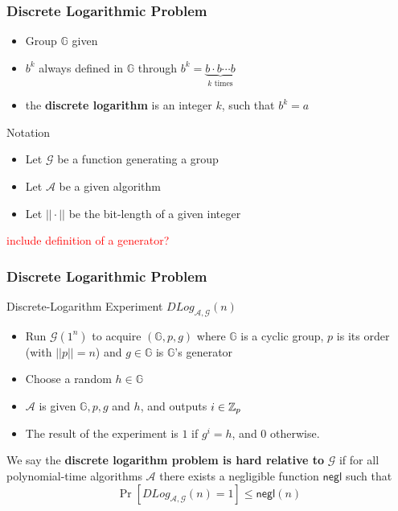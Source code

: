 \begin{frame}
	\frametitle{Discrete Logarithmic Problem}

	\begin{definition}
		\begin{itemize}
			\item Group $\mathbb{G}$ given
			\item $b^k$ always defined in $\mathbb{G}$ through $b^k = \underbrace{b\cdot b \cdots b}_{k\text{ times}}$
			\item the \textbf{discrete logarithm} is an integer $k$, such that $b^k = a$
		\end{itemize}
	\end{definition}
	\begin{block}{Notation}
		\begin{itemize}
			\item Let $\mathcal{G}$ be a function generating a group
			\item Let $\mathcal{A}$ be a given algorithm
			\item Let $||\cdot||$ be the bit-length of a given integer
		\end{itemize}
	\end{block}
	\textcolor{red}{include definition of a generator?}
\end{frame}

\begin{frame}
	\frametitle{Discrete Logarithmic Problem}
	\begin{block}{Discrete-Logarithm Experiment $DLog_{\mathcal{A}, \mathcal{G}}(n)$} %
		\begin{itemize}
			\item Run $\mathcal{G}(1^n)$ to acquire $(\mathbb{G}, p, g)$ where $\mathbb{G}$ is a cyclic group, $p$ is its order (with $||p|| = n$) and $g\in \mathbb{G}$ is $\mathbb{G}$'s generator
			\item Choose a random $h\in\mathbb{G}$
			\item $\mathcal{A}$ is given $\mathbb{G}, p, g$ and $h$, and outputs $i\in \mathbb{Z}_p$
			\item The result of the experiment is $1$ if $g^i = h$, and $0$ otherwise.
		\end{itemize}
	\end{block}
	\begin{definition}
		We say the \textbf{discrete logarithm problem is hard relative to} $\mathcal{G}$ if for all polynomial-time algorithms $\mathcal{A}$ there exists a negligible function $\textsf{negl}$ such that 
			$$\Pr[DLog_{\mathcal{A}, \mathcal{G}}(n) = 1] \leq \textsf{negl}(n)$$
	\end{definition}
\end{frame}